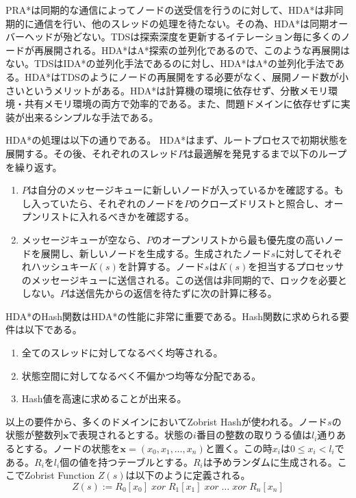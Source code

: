 \documentclass{jsarticle}
\renewcommand{\textbf}{} %
\begin{document}
PRA*は同期的な通信によってノードの送受信を行うのに対して、HDA*は非同期的に通信を行い、他のスレッドの処理を待たない。その為、HDA*は同期オーバーヘッドが殆どない。TDSは探索深度を更新するイテレーション毎に多くのノードが再展開される。HDA*はA*探索の並列化であるので、このような再展開はない。TDSはIDA*の並列化手法であるのに対し、HDA*はA*の並列化手法である。HDA*はTDSのようにノードの再展開をする必要がなく、展開ノード数が小さいというメリットがある。HDA*は計算機の環境に依存せず、分散メモリ環境・共有メモリ環境の両方で効率的である。また、問題ドメインに依存せずに実装が出来るシンプルな手法である。
\newline

HDA*の処理は以下の通りである。
HDA*はまず、ルートプロセスで初期状態を展開する。その後、それぞれのスレッド$P$は最適解を発見するまで以下のループを繰り返す。

\begin{enumerate}
	\item $P$は自分のメッセージキューに新しいノードが入っているかを確認する。もし入っていたら、それぞれのノードを$P$のクローズドリストと照合し、オープンリストに入れるべきかを確認する。
	\item メッセージキューが空なら、$P$のオープンリストから最も優先度の高いノードを展開し、新しいノードを生成する。生成されたノード$s$に対してそれぞれハッシュキー$K(s)$を計算する。ノード$s$は$K(s)$を担当するプロセッサのメッセージキューに送信される。この送信は非同期的で、ロックを必要としない。$P$は送信先からの返信を待たずに次の計算に移る。
\end{enumerate}

HDA*のHash関数はHDA*の性能に非常に重要である。Hash関数に求められる要件は以下である。

\begin{enumerate}
	\item 全てのスレッドに対してなるべく均等される。
	\item 状態空間に対してなるべく不偏かつ均等な分配である。
	\item Hash値を高速に求めることが出来る。
\end{enumerate}

以上の要件から、多くのドメインにおいて\textbf{Zobrist Hash}が使われる\cite{Zobrist1970}。ノード$s$の状態が整数列$\mathbf{x}$で表現されるとする。状態の$i$番目の整数の取りうる値は$l_{i}$通りあるとする。ノードの状態を$\mathbf{x} = (x_{0}, x_{1}, …, x_{n})$と置く。この時$x_{i}$は$0 \leq x_{i} < l_{i}$である。$R_{i}$を$l_{i}$個の値を持つテーブルとする。$R_{i}$は予めランダムに生成される。ここでZobrist Function $Z(s)$は以下のように定義される。
\newline
\begin{equation}
	Z(s) := R_{0}[x_{0}]\; xor\; R_{1}[x_{1}]\; xor\; …\; xor\; R_{n}[x_{n}] %
\end{equation}
\end{document}
